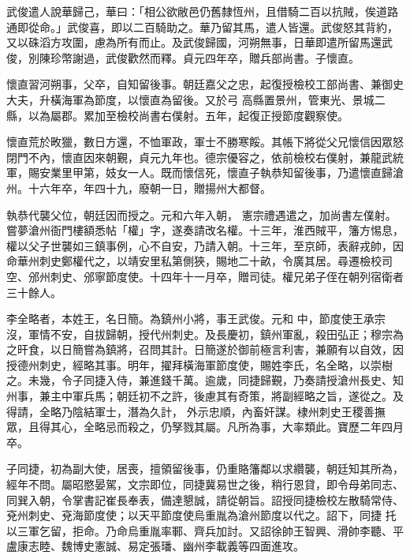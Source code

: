 \begin{pinyinscope}
 武俊遣人說華歸己，華曰：「相公欲敝邑仍舊隸恆州，且借騎二百以抗賊，俟道路通即從命。」武俊喜，即以二百騎助之。華乃留其馬，遣人皆還。武俊怒其背約，又以硃滔方攻圍，慮為所有而止。及武俊歸國，河朔無事，日華即遣所留馬還武俊，別陳珍幣謝過，武俊歡然而釋。貞元四年卒，贈兵部尚書。子懷直。



 懷直習河朔事，父卒，自知留後事。朝廷嘉父之忠，起復授檢校工部尚書、兼御史大夫，升橫海軍為節度，以懷直為留後。又於弓
 高縣置景州，管東光、景城二縣，以為屬郡。累加至檢校尚書右僕射。五年，起復正授節度觀察使。



 懷直荒於畋獵，數日方還，不恤軍政，軍士不勝寒餒。其帳下將從父兄懷信因眾怒閉門不內，懷直因來朝覲，貞元九年也。德宗優容之，依前檢校右僕射，兼龍武統軍，賜安業里甲第，妓女一人。既而懷信死，懷直子執恭知留後事，乃遣懷直歸滄州。十六年卒，年四十九，廢朝一日，贈揚州大都督。



 執恭代襲父位，朝廷因而授之。元和六年入朝，
 憲宗禮遇遣之，加尚書左僕射。嘗夢滄州衙門樓額悉帖「權」字，遂奏請改名權。十三年，淮西賊平，籓方惕息，權以父子世襲如三鎮事例，心不自安，乃請入朝。十三年，至京師，表辭戎帥，因命華州刺史鄭權代之，以靖安里私第側狹，賜地二十畝，令廣其居。尋遷檢校司空、邠州刺史、邠寧節度使。十四年十一月卒，贈司徒。權兄弟子侄在朝列宿衛者三十餘人。



 李全略者，本姓王，名日簡。為鎮州小將，事王武俊。元和
 中，節度使王承宗沒，軍情不安，自拔歸朝，授代州刺史。及長慶初，鎮州軍亂，殺田弘正；穆宗為之旰食，以日簡嘗為鎮將，召問其計。日簡遂於御前極言利害，兼願有以自效，因授德州刺史，經略其事。明年，擢拜橫海軍節度使，賜姓李氏，名全略，以崇樹之。未幾，令子同捷入侍，兼進錢千萬。逾歲，同捷歸覲，乃奏請授滄州長史、知州事，兼主中軍兵馬；朝廷初不之許，後慮其有奇策，將副經略之旨，遂從之。及得請，全略乃陰結軍士，潛為久計，
 外示忠順，內畜奸謀。棣州刺史王稷善撫眾，且得其心，全略忌而殺之，仍孥戮其屬。凡所為事，大率類此。寶歷二年四月卒。



 子同捷，初為副大使，居喪，擅領留後事，仍重賂籓鄰以求纘襲，朝廷知其所為，經年不問。屬昭愍晏駕，文宗即位，同捷冀易世之後，稍行恩貸，即令母弟同志、同巽入朝，令掌書記崔長奉表，備達懇誠，請從朝旨。詔授同捷檢校左散騎常侍、兗州刺史、兗海節度使；以天平節度使烏重胤為滄州節度以代之。詔下，同捷
 托以三軍乞留，拒命。乃命烏重胤率鄆、齊兵加討。又詔徐帥王智興、滑帥李聽、平盧康志睦、魏博史憲誠、易定張璠、幽州李載義等四面進攻。




\end{pinyinscope}
